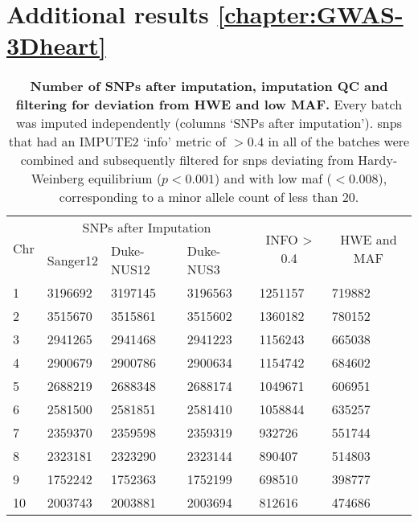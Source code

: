 \section{Additional results \cref{chapter:GWAS-3Dheart}}
\begin{table}[htbp]
  \centering
  \caption[\textbf{Number of SNPs after imputation, imputation QC and filtering for deviation from HWE and low MAF. }]{\textbf{Number of SNPs after imputation, imputation QC and filtering for deviation from HWE and low MAF. } Every batch was imputed independently (columns `SNPs after imputation'). \glspl{snp} that had an IMPUTE2 `info' metric of \(> 0.4\) in all of the batches were combined and subsequently filtered for \glspl{snp} deviating from Hardy-Weinberg equilibrium (\(p <0.001\)) and with low \gls{maf} (\(< 0.008\)), corresponding to a minor allele count of less than \num{20}. }
    \begin{tabular}{llllll}
    \toprule
    \multicolumn{1}{c}{\multirow{2}[4]{*}{Chr}} & \multicolumn{3}{c}{SNPs after Imputation} & \multicolumn{1}{c}{\multirow{2}[4]{*}{ INFO > 0.4}} & \multicolumn{1}{c}{\multirow{2}[4]{*}{HWE and MAF}} \\
\cmidrule{2-4}          & Sanger12 & Duke-NUS12 & Duke-NUS3 &       &  \\
    \midrule
    \num{1} & \num{3196692} & \num{3197145} & \num{3196563} & \num{1251157} & \num{719882} \\
    \num{2} & \num{3515670} & \num{3515861} & \num{3515602} & \num{1360182} & \num{780152} \\
    \num{3} & \num{2941265} & \num{2941468} & \num{2941223} & \num{1156243} & \num{665038} \\
    \num{4} & \num{2900679} & \num{2900786} & \num{2900634} & \num{1154742} & \num{684602} \\
    \num{5} & \num{2688219} & \num{2688348} & \num{2688174} & \num{1049671} & \num{606951} \\
    \num{6} & \num{2581500} & \num{2581851} & \num{2581410} & \num{1058844} & \num{635257} \\
    \num{7} & \num{2359370} & \num{2359598} & \num{2359319} & \num{932726} & \num{551744} \\
    \num{8} & \num{2323181} & \num{2323290} & \num{2323144} & \num{890407} & \num{514803} \\
    \num{9} & \num{1752242} & \num{1752363} & \num{1752199} & \num{698510} & \num{398777} \\
    \num{10} & \num{2003743} & \num{2003881} & \num{2003694} & \num{812616} & \num{474686} \\

\end{tabular}
\end{table}
